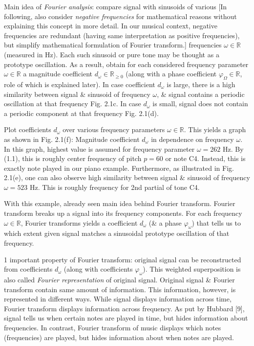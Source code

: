 \documentclass{article}
\begin{document}
\begin{itemize}
\begin{itemize}
		Main idea of {\it Fourier analysis}: compare signal with sinusoids of various [In following, also consider {\it negative frequencies} for mathematical reasons without explaining this concept in more detail. In our musical context, negative frequencies are redundant (having same interpretation as positive frequencies), but simplify mathematical formulation of Fourier transform.] frequencies $\omega\in\mathbb{R}$ (measured in Hz). Each such sinusoid or pure tone may be thought as a prototype oscillation. As a result, obtain for each considered frequency parameter $\omega\in\mathbb{R}$ a magnitude coefficient $d_\omega\in\mathbb{R}_{\ge0}$ (along with a phase coefficient $\varphi_\Omega\in\mathbb{R}$, role of which is explained later). In case coefficient $d_\omega$ is large, there is a high similarity between signal \& sinusoid of frequency $\omega$, \& signal contains a periodic oscillation at that frequency {\sf Fig. 2.1c}. In case $d_\omega$ is small, signal does not contain a periodic component at that frequency {\sf Fig. 2.1(d)}.
		
		Plot coefficients $d_\omega$ over various frequency parameters $\omega\in\mathbb{R}$. This yields a graph as shown in {\sf Fig. 2.1(f): Magnitude coefficient $d_\omega$ in dependence on frequency $\omega$.} In this graph, highest value is assumed for frequency parameter $\omega = 262$ Hz. By (1.1), this is roughly center frequency of pitch $p = 60$ or note C4. Instead, this is exactly note played in our piano example. Furthermore, as illustrated in {\sf Fig. 2.1(e)}, one can also observe high similarity between signal \& sinusoid of frequency $\omega = 523$ Hz. This is roughly frequency for 2nd partial of tone C4.
		
		With this example, already seen main idea behind Fourier transform. Fourier transform breaks up a signal into its frequency components. For each frequency $\omega\in\mathbb{R}$, Fourier transforms yields a coefficient $d_\omega$ (\& a phase $\varphi_\omega$) that tells us to which extent given signal matches a sinusoidal prototype oscillation of that frequency.
		
		1 important property of Fourier transform: original signal can be reconstructed from coefficients $d_\omega$ (along with coefficients $\varphi_\omega$). This weighted superposition is also called {\it Fourier representation} of original signal. Original signal \& Fourier transform contain same amount of information. This information, however, is represented in different ways. While signal displays information across time, Fourier transform displays information across frequency. As put by Hubbard [9], signal tells us when certain notes are played in time, but hides information about frequencies. In contrast, Fourier transform of music displays which notes (frequencies) are played, but hides information about when notes are played.
		

\end{itemize}
\end{itemize}
\end{document}
